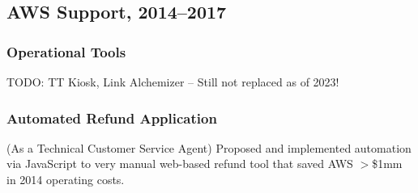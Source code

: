 \documentclass[9pt]{extarticle}
\begin{document}
\subsection{AWS Support, 2014--2017}

\subsubsection{Operational Tools}
TODO: TT Kiosk, Link Alchemizer -- Still not replaced as of 2023!

\subsubsection{Automated Refund Application}
(As a Technical Customer Service Agent) Proposed and implemented automation
via JavaScript to very manual web-based refund tool that saved AWS $>$\$1mm in
2014 operating costs.
\end{document}
